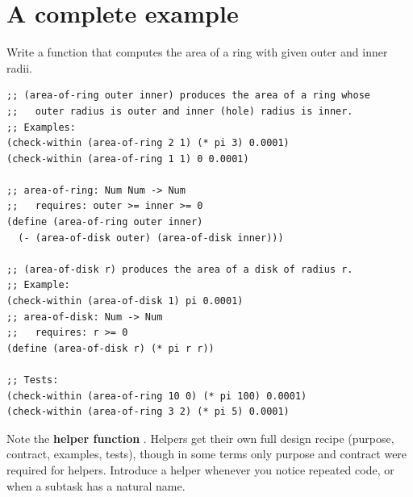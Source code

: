 \begin{center}
\end{center}

\section{A complete example}

\begin{example}
Write a function that computes the area of a ring with given outer and inner radii.
\begin{lstlisting}[style=racket]
;; (area-of-ring outer inner) produces the area of a ring whose
;;   outer radius is outer and inner (hole) radius is inner.
;; Examples:
(check-within (area-of-ring 2 1) (* pi 3) 0.0001)
(check-within (area-of-ring 1 1) 0 0.0001)

;; area-of-ring: Num Num -> Num
;;   requires: outer >= inner >= 0
(define (area-of-ring outer inner)
  (- (area-of-disk outer) (area-of-disk inner)))

;; (area-of-disk r) produces the area of a disk of radius r.
;; Example:
(check-within (area-of-disk 1) pi 0.0001)
;; area-of-disk: Num -> Num
;;   requires: r >= 0
(define (area-of-disk r) (* pi r r))

;; Tests:
(check-within (area-of-ring 10 0) (* pi 100) 0.0001)
(check-within (area-of-ring 3 2) (* pi 5) 0.0001)
\end{lstlisting}
\end{example}

Note the \textbf{helper function} . Helpers get their own
full design recipe (purpose, contract, examples, tests), though in some terms
only purpose and contract were required for helpers. Introduce a helper
whenever you notice repeated code, or when a subtask has a natural name.

